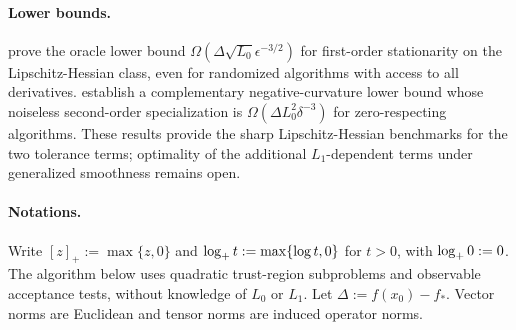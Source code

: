 \paragraph{Lower bounds.}
\citet{carmon2020lower} prove the oracle lower bound
$\Omega(\Delta\sqrt{L_0}\epsilon^{-3/2})$ for first-order
stationarity on the Lipschitz-Hessian class, even for randomized
algorithms with access to all derivatives.
\citet{arjevani2020second} establish a complementary
negative-curvature lower bound whose noiseless second-order
specialization is $\Omega(\Delta L_0^2\delta^{-3})$ for
zero-respecting algorithms.
These results provide the sharp Lipschitz-Hessian benchmarks for
the two tolerance terms; optimality of the additional
$L_1$-dependent terms under generalized smoothness remains open.

\paragraph{Notations.}
Write $[z]_+:=\max\{z,0\}$ and
$\log_+ t:=\max\{\log t,0\}$ for $t>0$, with $\log_+0:=0$.
The algorithm below uses quadratic trust-region subproblems and
observable acceptance tests, without knowledge of $L_0$ or $L_1$.
Let $\Delta:=f(x_0)-f_*$. Vector norms are Euclidean and tensor
norms are induced operator norms. 
